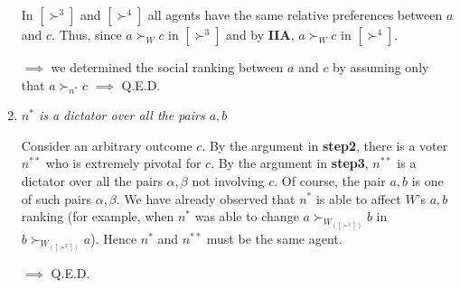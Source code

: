 \documentclass[pt11,a4paper,twoside,reqno,openright]{paper}
\begin{document}
\begin{enumerate}
	\noindent In $[\succ^3]$ and $[\succ^4]$ all agents have the same relative 
	preferences between $a$ and $c$. Thus, since $a \succ_W c$ in $[\succ^3]$ 
	and by \textbf{IIA}, $a \succ_W c$ in $[\succ^4]$. 

	\noindent $\implies$ we determined the social ranking between $a$ and $c$ 
	by assuming only that $a \succ_{n^*} c$ $\implies$ Q.E.D.

	\item \textit{$n^*$ is a dictator over all the pairs $a,b$}

	\noindent Consider an arbitrary outcome $c$. By the argument in 
	\textbf{step2}, there is a voter $n^{**}$ who is extremely pivotal for $c$. 
	By the argument in \textbf{step3}, $n^{**}$ is a dictator over all the pairs 
	$\alpha,\beta$ not involving $c$. Of course, the pair $a,b$ is one of such 
	pairs $\alpha,\beta$. We have already observed that $n^*$ is able to affect 
	$W$'s $a,b$ ranking (for example, when $n^*$ was able to change 
	$a \succ_{W_{([\succ^1])}} b$ in $b \succ_{W_{([\succ^2])}} a$). Hence $n^*$ and 
	$n^{**}$ must be the same agent.

	\noindent $\implies$ Q.E.D.
\end{enumerate}
\end{document}
